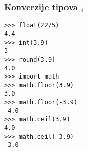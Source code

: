 \documentclass[utf8,compress,aspectratio=169]{beamer}
\begin{document}

\begin{frame}[fragile]
  \frametitle{Konverzije tipova $_4$}
\begin{verbatim}
>>> float(22/5)
4.4
>>> int(3.9)
3
>>> round(3.9)
4.0
>>> import math
>>> math.floor(3.9)
3.0
>>> math.floor(-3.9)
-4.0
>>> math.ceil(3.9)
4.0
>>> math.ceil(-3.9)
-3.0
\end{verbatim}
\end{frame}
\end{document}
